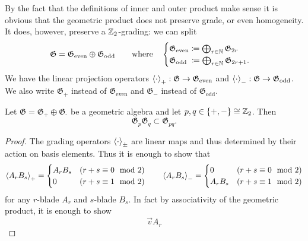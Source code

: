 By the fact that the definitions of inner and outer product make sense it is obvious that the geometric product does not preserve grade, or even homogeneity. It does, however, preserve a $\mathbb{Z}_2$-grading: we can split
\[ \mathfrak{G} = \mathfrak{G}_\text{even} \oplus \mathfrak{G}_\text{odd} \qquad \text{where}\quad \begin{cases}
\mathfrak{G}_\text{even} \coloneqq \bigoplus_{r\in \mathbb{N}}\mathfrak{G}_{2r} \\
\mathfrak{G}_\text{odd}\; \coloneqq \bigoplus_{r\in \mathbb{N}}\mathfrak{G}_{2r+1}.
\end{cases} \]
We have the linear projection operators $\left\langle \cdot \right\rangle_+:\mathfrak{G}\to \mathfrak{G}_\text{even}$ and $\left\langle \cdot \right\rangle_-:\mathfrak{G}\to \mathfrak{G}_\text{odd}$. We also write $\mathfrak{G}_+$ instead of $\mathfrak{G}_\text{even}$ and $\mathfrak{G}_-$ instead of $\mathfrak{G}_\text{odd}$.
\begin{proposition}
Let $\mathfrak{G} = \mathfrak{G}_\text{+} \oplus \mathfrak{G}_\text{-}$ be a geometric algebra and let $p,q\in\{+,-\}\cong \mathbb{Z}_2$. Then
\[ \mathfrak{G}_p\mathfrak{G}_q \subset \mathfrak{G}_{pq}. \]
\end{proposition}
\begin{proof}
The grading operators $\left\langle \cdot \right\rangle_\pm$ are linear maps and thus determined by their action on basis elements. Thus it is enough to show that
\[ \left\langle A_rB_s \right\rangle_+ =  \begin{cases}
A_rB_s & (r+s \equiv 0 \mod 2) \\
0 & (r+s \equiv 1 \mod 2)
\end{cases} \qquad \left\langle A_rB_s \right\rangle_- =  \begin{cases}
0 & (r+s \equiv 0 \mod 2) \\
A_rB_s & (r+s \equiv 1 \mod 2)
\end{cases} \]
for any $r$-blade $A_r$ and $s$-blade $B_s$. In fact by associativity of the geometric product, it is enough to show
\[ \vec{v}A_r \]
\end{proof}


